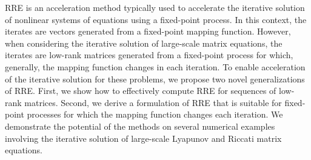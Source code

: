 \Ac{RRE} is an acceleration method typically used to accelerate the iterative solution of nonlinear systems of equations using a fixed-point process.
In this context, the iterates are vectors generated from a fixed-point mapping function.
However, when considering the iterative solution of large-scale matrix equations, the iterates are low-rank matrices generated from a fixed-point process for which, generally, the mapping function changes in each iteration.
To enable acceleration of the iterative solution for these problems, we propose two novel generalizations of \ac{RRE}.
First, we show how to effectively compute \ac{RRE} for sequences of low-rank matrices.
Second, we derive a formulation of \ac{RRE} that is suitable for fixed-point processes for which the mapping function changes each iteration.
We demonstrate the potential of the methods on several numerical examples involving the iterative solution of large-scale Lyapunov and Riccati matrix equations.
